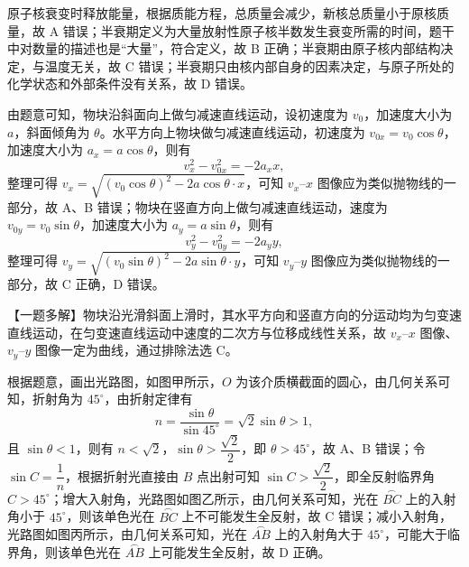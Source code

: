 
\begin{answer}
原子核衰变时释放能量，根据质能方程，总质量会减少，新核总质量小于原核质量，故 A 错误；半衰期定义为大量放射性原子核半数发生衰变所需的时间，题干中对数量的描述也是“大量”，符合定义，故 B 正确；半衰期由原子核内部结构决定，与温度无关，故 C 错误；半衰期只由核内部自身的因素决定，与原子所处的化学状态和外部条件没有关系，故 D 错误。
\end{answer}

\begin{answer}
由题意可知，物块沿斜面向上做匀减速直线运动，设初速度为 $v_{0}$，加速度大小为 $a$，斜面倾角为 $\theta$。水平方向上物块做匀减速直线运动，初速度为 $v_{0x}=v_{0}\cos\theta$，加速度大小为 $a_{x}=a\cos\theta$，则有
\[
  v_{x}^{2}-v_{0x}^{2}=-2a_{x}x,
\]
整理可得 $v_{x}=\sqrt{(v_{0}\cos\theta)^{2}-2a\cos\theta\cdot x}$，可知 $v_{x}$--$x$ 图像应为类似抛物线的一部分，故 A、B 错误；物块在竖直方向上做匀减速直线运动，速度为 $v_{0y}=v_{0}\sin\theta$，加速度大小为 $a_{y}=a\sin\theta$，则有
\[
  v_{y}^{2}-v_{0y}^{2}=-2a_{y}y,
\]
整理可得 $v_{y}=\sqrt{(v_{0}\sin\theta)^{2}-2a\sin\theta\cdot y}$，可知 $v_{y}$--$y$ 图像应为类似抛物线的一部分，故 C 正确，D 错误。

\begin{gktip}
【一题多解】物块沿光滑斜面上滑时，其水平方向和竖直方向的分运动均为匀变速直线运动，在匀变速直线运动中速度的二次方与位移成线性关系，故 $v_{x}$--$x$ 图像、$v_{y}$--$y$ 图像一定为曲线，通过排除法选 C。
\end{gktip}
\end{answer}

\begin{answer}
根据题意，画出光路图，如图甲所示，$O$ 为该介质横截面的圆心，由几何关系可知，折射角为 $45^{\circ}$，由折射定律有
\[
  n=\frac{\sin\theta}{\sin45^{\circ}}=\sqrt{2}\sin\theta>1,
\]
且 $\sin\theta<1$，则有 $n<\sqrt{2}$，$\sin\theta>\dfrac{\sqrt{2}}{2}$，即 $\theta>45^{\circ}$，故 A、B 错误；令 $\sin C=\dfrac{1}{n}$，根据折射光直接由 $B$ 点出射可知 $\sin C>\dfrac{\sqrt{2}}{2}$，即全反射临界角 $C>45^{\circ}$；增大入射角，光路图如图乙所示，由几何关系可知，光在 $\overset{\frown}{BC}$ 上的入射角小于 $45^{\circ}$，则该单色光在 $\overset{\frown}{BC}$ 上不可能发生全反射，故 C 错误；减小入射角，光路图如图丙所示，由几何关系可知，光在 $\overset{\frown}{AB}$ 上的入射角大于 $45^{\circ}$，可能大于临界角，则该单色光在 $\overset{\frown}{AB}$ 上可能发生全反射，故 D 正确。

\end{answer}

